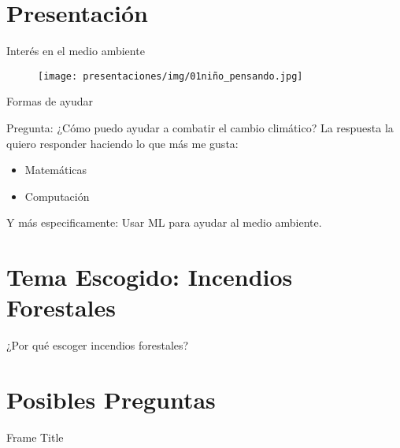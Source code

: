 \section{Presentación}
\begin{frame}{Interés en el medio ambiente}
\begin{figure}
    \centering
    \texttt{[image: presentaciones/img/01niño\_pensando.jpg]}
\end{figure}
\end{frame}

\begin{frame}{Formas de ayudar}
    \begin{block}{Pregunta: ¿Cómo puedo ayudar a combatir el cambio climático?}
    La respuesta la quiero responder haciendo lo que más me gusta:
    \begin{itemize}
        \item Matemáticas
        \item Computación
    \end{itemize}
    Y más especificamente: Usar ML para ayudar al medio ambiente.
    \end{block}
\end{frame}

\section{Tema Escogido: Incendios Forestales}
\begin{frame}{¿Por qué escoger incendios forestales?}
    
\end{frame}

\section{Posibles Preguntas}
\begin{frame}{Frame Title}
    
\end{frame}

